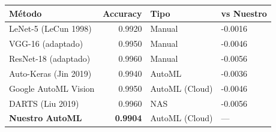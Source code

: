 \begin{tabular}{lrll}
\toprule
Método & Accuracy & Tipo & vs Nuestro \\
\midrule
LeNet-5 (LeCun 1998) & 0.9920 & Manual & -0.0016 \\
VGG-16 (adaptado) & 0.9950 & Manual & -0.0046 \\
ResNet-18 (adaptado) & 0.9960 & Manual & -0.0056 \\
Auto-Keras (Jin 2019) & 0.9940 & AutoML & -0.0036 \\
Google AutoML Vision & 0.9950 & AutoML (Cloud) & -0.0046 \\
DARTS (Liu 2019) & 0.9960 & NAS & -0.0056 \\
\midrule
\textbf{Nuestro AutoML} & \textbf{0.9904} & AutoML (Cloud) & --- \\
\bottomrule
\end{tabular}